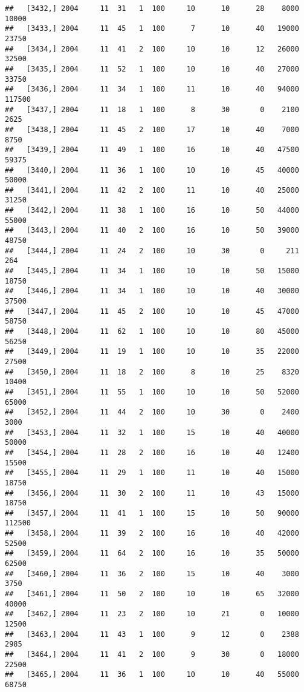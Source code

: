 \documentclass{article}\usepackage[]{graphicx}\usepackage[]{color}
\makeatletter
\newenvironment{kframe}{%
 \def\at@end@of@kframe{}%
 \ifinner\ifhmode%
  \def\at@end@of@kframe{\end{minipage}}%
  \begin{minipage}{\columnwidth}%
 \fi\fi%
 \def\FrameCommand##1{\hskip\@totalleftmargin \hskip-\fboxsep
 \colorbox{shadecolor}{##1}\hskip-\fboxsep
     \hskip-\linewidth \hskip-\@totalleftmargin \hskip\columnwidth}%
 \MakeFramed {\advance\hsize-\width
   \@totalleftmargin\z@ \linewidth\hsize
   \@setminipage}}%
 {\par\unskip\endMakeFramed%
 \at@end@of@kframe}
\newenvironment{knitrout}{}{} %
\makeatother
\begin{document}
\begin{knitrout}
\begin{kframe}
\begin{verbatim}
##   [3432,] 2004     11  31   1  100     10      10      28    8000   10000
##   [3433,] 2004     11  45   1  100      7      10      40   19000   23750
##   [3434,] 2004     11  41   2  100     10      10      12   26000   32500
##   [3435,] 2004     11  52   1  100     10      10      40   27000   33750
##   [3436,] 2004     11  34   1  100     11      10      40   94000  117500
##   [3437,] 2004     11  18   1  100      8      30       0    2100    2625
##   [3438,] 2004     11  45   2  100     17      10      40    7000    8750
##   [3439,] 2004     11  49   1  100     16      10      40   47500   59375
##   [3440,] 2004     11  36   1  100     10      10      45   40000   50000
##   [3441,] 2004     11  42   2  100     11      10      40   25000   31250
##   [3442,] 2004     11  38   1  100     16      10      50   44000   55000
##   [3443,] 2004     11  40   2  100     16      10      50   39000   48750
##   [3444,] 2004     11  24   2  100     10      30       0     211     264
##   [3445,] 2004     11  34   1  100     10      10      50   15000   18750
##   [3446,] 2004     11  34   1  100     10      10      40   30000   37500
##   [3447,] 2004     11  45   2  100     10      10      45   47000   58750
##   [3448,] 2004     11  62   1  100     10      10      80   45000   56250
##   [3449,] 2004     11  19   1  100     10      10      35   22000   27500
##   [3450,] 2004     11  18   2  100      8      10      25    8320   10400
##   [3451,] 2004     11  55   1  100     10      10      50   52000   65000
##   [3452,] 2004     11  44   2  100     10      30       0    2400    3000
##   [3453,] 2004     11  32   1  100     15      10      40   40000   50000
##   [3454,] 2004     11  28   2  100     16      10      40   12400   15500
##   [3455,] 2004     11  29   1  100     11      10      40   15000   18750
##   [3456,] 2004     11  30   2  100     11      10      43   15000   18750
##   [3457,] 2004     11  41   1  100     15      10      50   90000  112500
##   [3458,] 2004     11  39   2  100     16      10      40   42000   52500
##   [3459,] 2004     11  64   2  100     16      10      35   50000   62500
##   [3460,] 2004     11  36   2  100     15      10      40    3000    3750
##   [3461,] 2004     11  50   2  100     10      10      65   32000   40000
##   [3462,] 2004     11  23   2  100     10      21       0   10000   12500
##   [3463,] 2004     11  43   1  100      9      12       0    2388    2985
##   [3464,] 2004     11  41   2  100      9      30       0   18000   22500
##   [3465,] 2004     11  36   1  100     10      10      40   55000   68750

\end{verbatim}
\end{kframe}
\end{knitrout}
\end{document}
